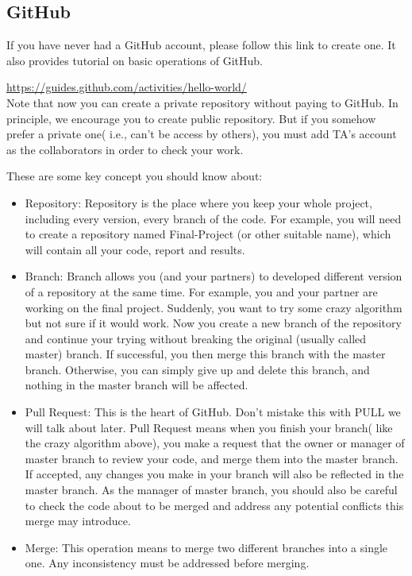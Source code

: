 \documentclass[12pt, fullpage,letterpaper]{article}
\begin{document}
\subsection*{GitHub}
If you have never had a GitHub account, please follow this link to create one. It also provides tutorial on basic operations of GitHub.


\href{https://guides.github.com/activities/hello-world/}{https://guides.github.com/activities/hello-world/}\\

Note that now you can create a private repository without paying to GitHub. In principle, we encourage you to create public repository. But if you somehow prefer a private one( i.e., can't be access by others), you must add TA's account as the collaborators in order to check your work.  

These are some key concept you should know about:
\begin{itemize}
	\item Repository: Repository is the place where you keep your whole project, including every version, every branch of the code. For example, you will need to create a repository named Final-Project (or other suitable name), which will contain all your code, report and results.
	
	\item Branch: Branch allows you (and your partners) to developed different version of a repository at the same time. For example, you and your partner are working on the final project. Suddenly, you want to try some crazy algorithm but not sure if it would work. Now you create a new branch of the repository and continue your trying without breaking the original (usually called master) branch. If successful, you then merge this branch with the master branch. Otherwise, you can simply give up and delete this branch, and nothing in the master branch will be affected. 
	
	\item Pull Request: This is the heart of GitHub. Don't mistake this with PULL we will talk about later. Pull Request means when you finish your branch( like the crazy algorithm above), you make a request that the owner or manager of master branch to review your code, and merge them into the master branch. If accepted, any changes you make in your branch will also be reflected in the master branch. As the manager of master branch, you should also be careful to check the code about to be merged and address any potential conflicts this merge may introduce. 
	
	\item Merge: This operation means to merge two different branches into a single one. Any inconsistency must be addressed before merging. 
\end{itemize}
\end{document}
